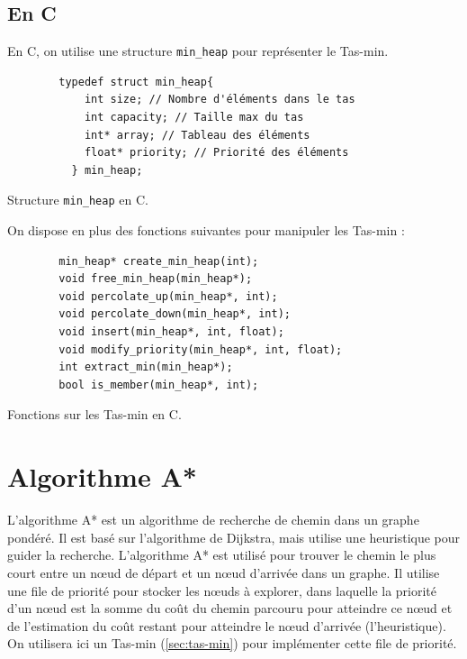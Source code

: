 \subsection{En C}

En C, on utilise une structure \texttt{min\_heap} pour représenter le Tas-min.

\begin{listing}[!htpb]
    \begin{verbatim}
        typedef struct min_heap{
            int size; // Nombre d'éléments dans le tas
            int capacity; // Taille max du tas
            int* array; // Tableau des éléments
            float* priority; // Priorité des éléments
          } min_heap;
    \end{verbatim}
    \caption{Structure \texttt{min\_heap} en C.}
    \label{listing:c-min_heap}
\end{listing}

On dispose en plus des fonctions suivantes pour manipuler les Tas-min :

\begin{listing}[!htpb]
    \begin{verbatim}
        min_heap* create_min_heap(int);
        void free_min_heap(min_heap*);
        void percolate_up(min_heap*, int);
        void percolate_down(min_heap*, int);
        void insert(min_heap*, int, float);
        void modify_priority(min_heap*, int, float);
        int extract_min(min_heap*);
        bool is_member(min_heap*, int); 
    \end{verbatim}
    \caption{Fonctions sur les Tas-min en C.}
    \label{listing:c-min_heap-fonctions}
\end{listing}

\section{Algorithme A*}
\label{sec:a-star}

L'algorithme A* \citep{astar} est un algorithme de recherche de chemin dans un graphe pondéré.
Il est basé sur l'algorithme de Dijkstra, mais utilise une heuristique pour guider la recherche.
L'algorithme A* est utilisé pour trouver le chemin le plus court entre un nœud de départ et un nœud d'arrivée dans un graphe.
\newline
Il utilise une file de priorité pour stocker les nœuds à explorer, dans laquelle la priorité d'un nœud est la somme du coût du chemin parcouru pour atteindre ce nœud et de l'estimation du coût restant pour atteindre le nœud d'arrivée (l'heuristique). 
On utilisera ici un Tas-min (\autoref{sec:tas-min}) pour implémenter cette file de priorité.

